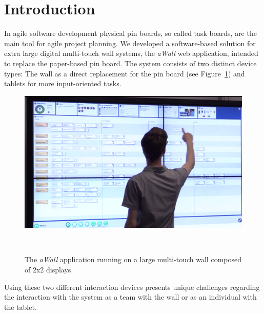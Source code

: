 \documentclass{sigchi}
\begin{document}



\section{Introduction}
In agile software development physical pin boards, so called task boards, are the main tool for agile project planning. We developed a software-based solution for extra large digital multi-touch wall systems, the \textit{aWall} web application, intended to replace the paper-based pin board.
The system consists of two distinct device types: The wall as a direct replacement for the pin board (see Figure~\ref{fig:awall}) and tablets for more input-oriented tasks.

\begin{figure}[h]
	\centering
	\includegraphics[width=\columnwidth]{figures/awall}
	\caption{The \textit{aWall} application running on a large multi-touch wall composed of 2x2 displays.}
	~\label{fig:awall}
\end{figure}

Using these two different interaction devices presents unique challenges regarding the interaction with the system as a team with the wall or as an individual with the tablet.
\end{document}
